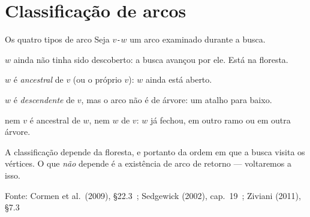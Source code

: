 \documentclass[aspectratio=169]{beamer}
\newcommand{\fonte}[1]{\vfill{\tiny\color{gray!60!black}Fonte: #1\par}}
\begin{document}
\section{Classificação de arcos}

\begin{frame}{Os quatro tipos de arco}
  {\small Seja $v$\texttt{-}$w$ um arco examinado durante a busca.}
  \medskip
  {\small
  \begin{description}\small
    \item[\textcolor{orange!80!black}{arco de árvore}] $w$ ainda não tinha sido
      descoberto: a busca avançou por ele. Está na floresta.
    \item[\textcolor{red!75!black}{arco de retorno}] $w$ é \emph{ancestral} de
      $v$ (ou o próprio $v$): $w$ ainda está aberto.
    \item[\textcolor{green!45!black}{arco de avanço}] $w$ é \emph{descendente}
      de $v$, mas o arco não é de árvore: um atalho para baixo.
    \item[\textcolor{violet!80!black}{arco cruzado}] nem $v$ é ancestral de $w$,
      nem $w$ de $v$: $w$ já fechou, em outro ramo ou em outra árvore.
  \end{description}}
  \medskip
  {\scriptsize A classificação depende da floresta, e portanto da ordem em que a
  busca visita os vértices. O que \emph{não} depende é a existência de arco de
  retorno --- voltaremos a isso.}
  \fonte{Cormen et al.\ (2009), \S 22.3~\cite{cormen2009introduction}; Sedgewick (2002), cap.\ 19~\cite{sedgewick2002algorithms}; Ziviani (2011), \S 7.3~\cite{ziviani2011projeto}}
\end{frame}
\end{document}
